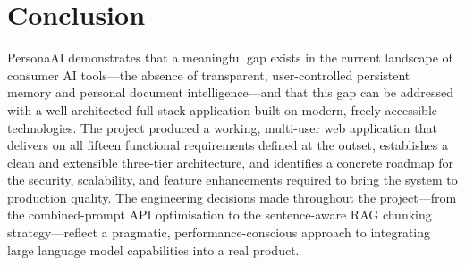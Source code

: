 \documentclass[12pt,a4paper]{report}
\begin{document}
\section{Conclusion}

PersonaAI demonstrates that a meaningful gap exists in the current landscape of consumer AI tools—the absence of transparent, user-controlled persistent memory and personal document intelligence—and that this gap can be addressed with a well-architected full-stack application built on modern, freely accessible technologies. The project produced a working, multi-user web application that delivers on all fifteen functional requirements defined at the outset, establishes a clean and extensible three-tier architecture, and identifies a concrete roadmap for the security, scalability, and feature enhancements required to bring the system to production quality. The engineering decisions made throughout the project—from the combined-prompt API optimisation to the sentence-aware RAG chunking strategy—reflect a pragmatic, performance-conscious approach to integrating large language model capabilities into a real product.
\end{document}
